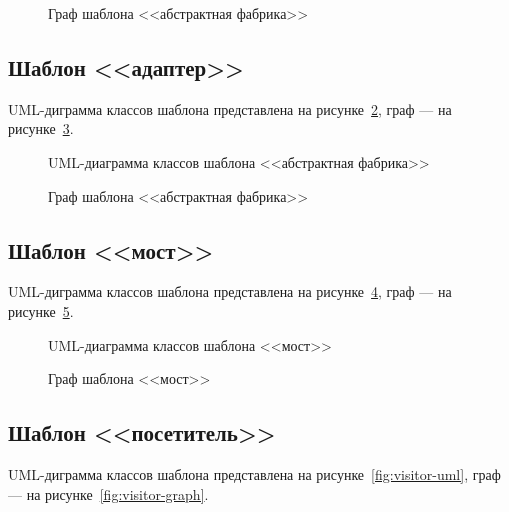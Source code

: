 \begin{figure}[!ht]
\centering
\caption{Граф шаблона <<абстрактная фабрика>>}
\label{fig:AbstractFactory-graph}
\end{figure}

\subsection{Шаблон <<адаптер>>}

UML-диграмма классов шаблона представлена на рисунке~\ref{fig:Adapter-uml},
граф --- на рисунке~\ref{fig:Adapter-graph}.

\begin{figure}[!ht]
\centering
\caption{UML-диаграмма классов шаблона <<абстрактная фабрика>>}
\label{fig:Adapter-uml}
\end{figure}

\begin{figure}[!ht]
\centering
\caption{Граф шаблона <<абстрактная фабрика>>}
\label{fig:Adapter-graph}
\end{figure}

\subsection{Шаблон <<мост>>}

UML-диграмма классов шаблона представлена на рисунке~\ref{fig:Bridge-uml},
граф --- на рисунке~\ref{fig:Bridge-graph}.

\begin{figure}[!ht]
\centering
\caption{UML-диаграмма классов шаблона <<мост>>}
\label{fig:Bridge-uml}
\end{figure}

\begin{figure}[!ht]
\centering
\caption{Граф шаблона <<мост>>}
\label{fig:Bridge-graph}
\end{figure}

\subsection{Шаблон <<посетитель>>}

UML-диграмма классов шаблона представлена на рисунке~\ref{fig:visitor-uml},
граф --- на рисунке~\ref{fig:visitor-graph}.

